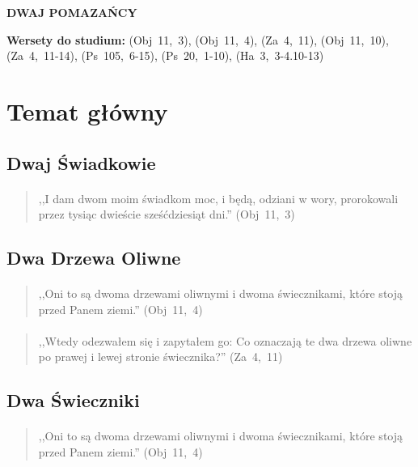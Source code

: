 \documentclass[10pt,a4paper,oneside]{article}
\begin{document}
\centerline{\textbf{\MakeUppercase{Dwaj Pomazańcy}}}
\begin{center}
\textbf{Wersety do studium:} 
\mbox{(Obj 11, 3)}, \mbox{(Obj 11, 4)}, \mbox{(Za 4, 11)}, \mbox{(Obj 11, 10)}, \mbox{(Za 4, 11-14)}, \mbox{(Ps 105, 6-15)}, \mbox{(Ps 20, 1-10)}, \mbox{(Ha 3, 3-4.10-13)}
\end{center}
\section{Temat główny}
\subsection{Dwaj Świadkowie}
\paragraph{}
\begin{quote}
,,I dam dwom moim świadkom moc, i będą, odziani w wory, prorokowali przez tysiąc dwieście sześćdziesiąt dni.'' \mbox{(Obj 11, 3)}
\end{quote}
\subsection{Dwa Drzewa Oliwne}
\paragraph{}
\begin{quote}
,,Oni to są dwoma drzewami oliwnymi i dwoma świecznikami, które stoją przed Panem ziemi.'' \mbox{(Obj 11, 4)}
\end{quote}
\paragraph{}
\begin{quote}
,,Wtedy odezwałem się i zapytałem go: Co oznaczają te dwa drzewa oliwne po prawej i lewej stronie świecznika?'' \mbox{(Za 4, 11)}
\end{quote}
\subsection{Dwa Świeczniki}
\paragraph{}
\begin{quote}
,,Oni to są dwoma drzewami oliwnymi i dwoma świecznikami, które stoją przed Panem ziemi.'' \mbox{(Obj 11, 4)}
\end{quote}
\end{document}
